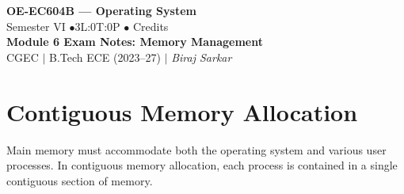 \documentclass[12pt,a4paper]{article}
\begin{document}

\begin{center}
  {\LARGE\bfseries\color{myred} OE-EC604B --- Operating System}\\[5pt]
  {\normalsize\color{mydark} Semester VI \quad$\bullet$\quad 3L:0T:0P \quad$\bullet$ Credits}\\[3pt]
  {\normalsize\color{myteal}\textbf{Module 6 Exam Notes: Memory Management}}\\[3pt]
  {\small\color{mydark} CGEC \;$|$\; B.Tech ECE (2023--27) \;$|$\; \textit{Biraj Sarkar}}
\end{center}
\vspace{2pt}
\noindent{\color{myred}\rule{\linewidth}{1.5pt}}
\vspace{2pt}

\hypersetup{linkcolor=mydark}
\tableofcontents
\hypersetup{linkcolor=myteal}
\newpage

\section{Contiguous Memory Allocation}

Main memory must accommodate both the operating system and various user processes. In contiguous memory allocation, each process is contained in a single contiguous section of memory.
\end{document}
